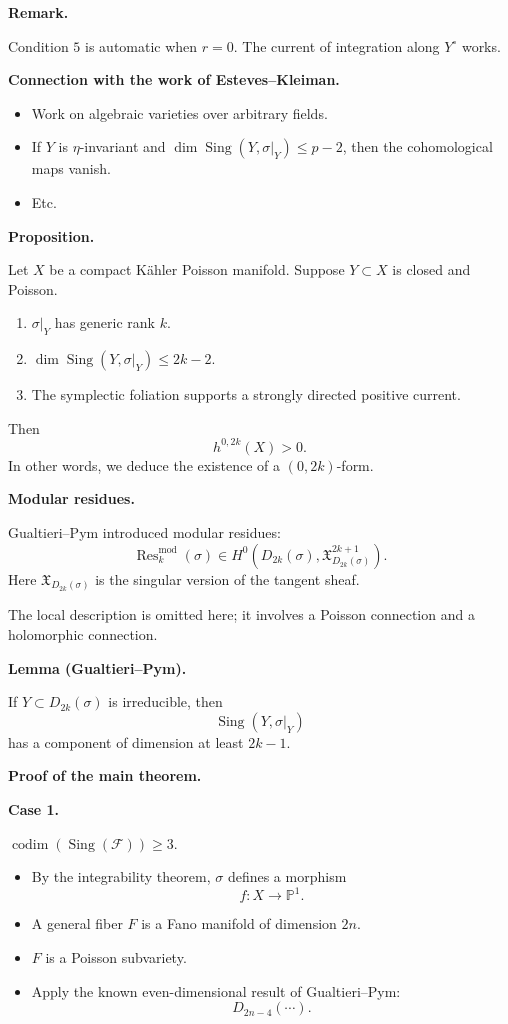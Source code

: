 \medskip\noindent
{\bf Remark.}

Condition $5$ is automatic when
$r=0$.
The current of integration along
$Y^\circ$ works.

\medskip\noindent
{\bf Connection with the work of
Esteves--Kleiman.}

\begin{itemize}
\item Work on algebraic varieties over
arbitrary fields.
\item If $Y$ is $\eta$-invariant and
$\dim \operatorname{Sing}(Y,\sigma|_Y)
\leq p-2$, then the cohomological maps
vanish.
\item Etc.
\end{itemize}

\medskip\noindent
{\bf Proposition.}

Let $X$ be a compact K\"ahler
Poisson manifold.
Suppose $Y\subset X$ is closed and
Poisson.
\begin{enumerate}
\item $\sigma|_Y$ has generic rank
$k$.
\item $\dim \operatorname{Sing}
(Y,\sigma|_Y)\leq 2k-2$.
\item The symplectic foliation
supports a strongly directed positive
current.
\end{enumerate}
Then
$$
h^{0,2k}(X)>0.
$$
In other words, we deduce the
existence of a $(0,2k)$-form.

\medskip\noindent
{\bf Modular residues.}

Gualtieri--Pym introduced modular
residues:
$$
\operatorname{Res}^{\mathrm{mod}}_k(\sigma)
\in
H^0\!\left(
D_{2k}(\sigma),
\mathfrak X_{D_{2k}(\sigma)}^{2k+1}
\right).
$$
Here $\mathfrak X_{D_{2k}(\sigma)}$ is
the singular version of the tangent
sheaf.

The local description is omitted here;
it involves a Poisson connection and a
holomorphic connection.

\medskip\noindent
{\bf Lemma (Gualtieri--Pym).}

If $Y\subset D_{2k}(\sigma)$ is
irreducible, then
$$
\operatorname{Sing}(Y,\sigma|_Y)
$$
has a component of dimension at least
$2k-1$.

\medskip\noindent
{\bf Proof of the main theorem.}

\medskip\noindent
{\bf Case 1.}

$\operatorname{codim}
(\operatorname{Sing}(\mathcal F))
\geq 3$.

\begin{itemize}
\item By the integrability theorem,
$\sigma$ defines a morphism
$$
f:X\to \mathbb{P}^1.
$$
\item A general fiber $F$ is a Fano
manifold of dimension $2n$.
\item $F$ is a Poisson subvariety.
\item Apply the known even-dimensional
result of Gualtieri--Pym:
$$
D_{2n-4}(\cdots).
$$
\end{itemize}

